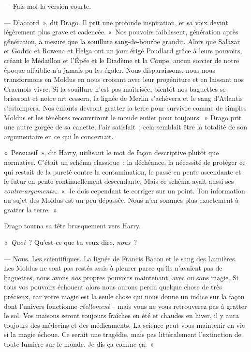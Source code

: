 --- Fais-moi la version courte.


--- D'accord~», dit Drago. Il prit une profonde inspiration, et sa voix devint légèrement plus grave et cadencée.
«~Nos pouvoirs faiblissent, génération après génération, à mesure que la souillure sang-de-bourbe grandit.
Alors que Salazar et Godric et Rowena et Helga ont un jour érigé Poudlard grâce à leurs pouvoirs, créant le Médaillon et l'Épée et le Diadème et la Coupe, aucun sorcier de notre époque affaiblie n'a jamais pu les égaler.
Nous disparaissons, nous nous transformons en Moldus en nous croisant avec leur progéniture et en laissant nos Cracmols vivre.
Si la souillure n'est pas maîtrisée, bientôt nos baguettes se briseront et notre art cessera, la lignée de Merlin s'achèvera et le sang d'Atlantis s'estompera.
Nos enfants devront gratter la terre pour survivre comme de simples Moldus et les ténèbres recouvriront le monde entier pour toujours.~»
Drago prit une autre gorgée de sa canette, l'air satisfait~; cela semblait être la totalité de son argumentaire en ce qui le concernait.

«~Persuasif~», dit Harry, utilisant le mot de façon descriptive plutôt que normative.
C'était un schéma classique~: la déchéance, la nécessité de protéger ce qui restait de la pureté contre la contamination, le passé en pente ascendante et le futur en pente continuellement descendante.
Mais ce schéma avait aussi ses \emph{contre-arguments}…
«~Je dois cependant te corriger sur un point.
Ton information au sujet des Moldus est un peu dépassée. 
Nous n'en sommes plus exactement à gratter la terre.~»

Drago tourna sa tête brusquement vers Harry.

«~\emph{Quoi}~? Qu'est-ce que tu veux dire, \emph{nous}~?

--- Nous. Les scientifiques. La lignée de Francis Bacon et le sang des Lumières.
Les Moldus ne sont pas restés assis à pleurer parce qu'ils n'avaient pas de baguettes, nous avons \emph{nos} propres pouvoirs maintenant, avec ou sans magie.
Si tous vos pouvoirs échouent alors nous aurons perdu quelque chose de très précieux, car votre magie est la seule chose qui nous donne un indice sur la façon dont l'univers fonctionne \emph{réellement} -- mais vous ne vous retrouverez pas à gratter le sol.
Vos maisons seront toujours fraîches en été et chaudes en hiver, il y aura toujours des médecins et des médicaments.
La science peut vous maintenir en vie si la magie échoue.
Ce serait une tragédie, mais pas littéralement l'extinction de toute lumière sur le monde.
Je dis ça comme ça.~»

